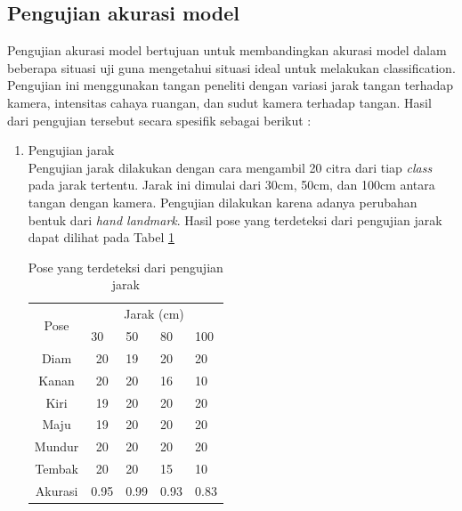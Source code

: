 \subsection{Pengujian akurasi model}
Pengujian akurasi model bertujuan untuk membandingkan akurasi model dalam beberapa situasi uji guna mengetahui situasi ideal untuk melakukan classification. Pengujian ini menggunakan tangan peneliti dengan variasi jarak tangan terhadap kamera, intensitas cahaya ruangan, dan sudut kamera terhadap tangan. Hasil dari pengujian tersebut secara spesifik sebagai berikut :
\begin{enumerate}
  \item Pengujian jarak \\
  Pengujian jarak dilakukan dengan cara mengambil 20 citra dari tiap \emph{class} pada jarak tertentu. Jarak ini dimulai dari 30cm, 50cm, dan 100cm antara tangan dengan kamera. Pengujian dilakukan karena adanya perubahan bentuk dari \emph{hand landmark}. Hasil pose yang terdeteksi dari pengujian jarak dapat dilihat pada Tabel \ref{tab:hasiljarak}

  \begin{table}[H]
    \centering
    \caption{Pose yang terdeteksi dari pengujian jarak}
    \label{tab:hasiljarak}
    \begin{tabular}{|c|clll|}
      \hline
      \multirow{2}{*}{Pose} & \multicolumn{4}{c|}{Jarak (cm)}                                                   \\ \cline{2-5} 
                            & \multicolumn{1}{l|}{30} & \multicolumn{1}{l|}{50} & \multicolumn{1}{l|}{80} & 100 \\ \hline
      Diam                  & \multicolumn{1}{c|}{20}   & \multicolumn{1}{l|}{19}   & \multicolumn{1}{l|}{20}   &   20  \\ \hline
      Kanan                 & \multicolumn{1}{c|}{20}   & \multicolumn{1}{l|}{20}   & \multicolumn{1}{l|}{16}   &   10  \\ \hline
      Kiri                  & \multicolumn{1}{c|}{19}   & \multicolumn{1}{l|}{20}   & \multicolumn{1}{l|}{20}   &   20  \\ \hline
      Maju                  & \multicolumn{1}{c|}{19}   & \multicolumn{1}{l|}{20}   & \multicolumn{1}{l|}{20}   &   20  \\ \hline
      Mundur                & \multicolumn{1}{c|}{20}   & \multicolumn{1}{l|}{20}   & \multicolumn{1}{l|}{20}   &   20  \\ \hline
      Tembak                & \multicolumn{1}{c|}{20}   & \multicolumn{1}{l|}{20}   & \multicolumn{1}{l|}{15}   &   10  \\ \hline
      Akurasi                  & \multicolumn{1}{c|}{0.95}   & \multicolumn{1}{l|}{0.99}   & \multicolumn{1}{l|}{0.93}   &   0.83  \\ \hline
    \end{tabular}
  \end{table}


\end{enumerate}
